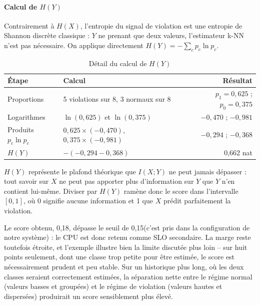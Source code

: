 \paragraph{Calcul de $H(Y)$}

Contrairement à $H(X)$, l'entropie du signal de violation est une entropie de Shannon discrète classique : $Y$ ne prenant que deux valeurs, l'estimateur k-NN n'est pas nécessaire. On applique directement $H(Y) = -\sum_c p_c \ln p_c$.

\begin{table}[H]
    \centering
    
    \label{tab:mi-hy}
    \begin{tabular}{|l|l|r|}
        \hline
        \textbf{Étape} & \textbf{Calcul} & \textbf{Résultat} \\
        \hline
        Proportions & 5 violations sur 8, 3 normaux sur 8 & $p_1 = 0{,}625$ ; $p_0 = 0{,}375$ \\
        \hline
        Logarithmes & $\ln(0{,}625)$ et $\ln(0{,}375)$ & $-0{,}470$ ; $-0{,}981$ \\
        \hline
        Produits $p_c \ln p_c$ & $0{,}625 \times (-0{,}470)$, $0{,}375 \times (-0{,}981)$ & $-0{,}294$ ; $-0{,}368$ \\
        \hline
        $H(Y)$ & $-(-0{,}294 - 0{,}368)$ & 0,662 nat \\
        \hline
    \end{tabular}
    \caption{Détail du calcul de $H(Y)$}
\end{table}

$H(Y)$ représente le plafond théorique que $I(X;Y)$ ne peut jamais dépasser : tout savoir sur $X$ ne peut pas apporter plus d'information sur $Y$ que $Y$ n'en contient lui-même. Diviser par $H(Y)$ ramène donc le score dans l'intervalle $[0,1]$, où 0 signifie aucune information et 1 que $X$ prédit parfaitement la violation.

Le score obtenu, 0,18, dépasse le seuil de 0,15(c'est pris dans la configuration de notre système) : le CPU est donc retenu comme SLO secondaire. La marge reste toutefois étroite, et l'exemple illustre bien la limite discutée plus loin -- sur huit points seulement, dont une classe trop petite pour être estimée, le score est nécessairement prudent et peu stable. Sur un historique plus long, où les deux classes seraient correctement estimées, la séparation nette entre le régime normal (valeurs basses et groupées) et le régime de violation (valeurs hautes et dispersées) produirait un score sensiblement plus élevé.

